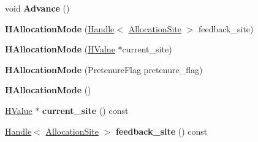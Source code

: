 \begin{DoxyCompactItemize}
\item 
\hypertarget{classv8_1_1internal_1_1_b_a_s_e___e_m_b_e_d_d_e_d_a4b06fdbbb29fc7d6641a995803b6d7ec}{}void {\bfseries Advance} ()\label{classv8_1_1internal_1_1_b_a_s_e___e_m_b_e_d_d_e_d_a4b06fdbbb29fc7d6641a995803b6d7ec}

\item 
\hypertarget{classv8_1_1internal_1_1_b_a_s_e___e_m_b_e_d_d_e_d_a0dffc75e1bed909e6597642502c4df79}{}{\bfseries H\+Allocation\+Mode} (\hyperlink{classv8_1_1internal_1_1_handle}{Handle}$<$ \hyperlink{classv8_1_1internal_1_1_allocation_site}{Allocation\+Site} $>$ feedback\+\_\+site)\label{classv8_1_1internal_1_1_b_a_s_e___e_m_b_e_d_d_e_d_a0dffc75e1bed909e6597642502c4df79}

\item 
\hypertarget{classv8_1_1internal_1_1_b_a_s_e___e_m_b_e_d_d_e_d_a4cca33cea9fb568478c40f6e2913b4a3}{}{\bfseries H\+Allocation\+Mode} (\hyperlink{classv8_1_1internal_1_1_h_value}{H\+Value} $\ast$current\+\_\+site)\label{classv8_1_1internal_1_1_b_a_s_e___e_m_b_e_d_d_e_d_a4cca33cea9fb568478c40f6e2913b4a3}

\item 
\hypertarget{classv8_1_1internal_1_1_b_a_s_e___e_m_b_e_d_d_e_d_a3d2dc2541dfb63d0025ca44ec56ea7d5}{}{\bfseries H\+Allocation\+Mode} (Pretenure\+Flag pretenure\+\_\+flag)\label{classv8_1_1internal_1_1_b_a_s_e___e_m_b_e_d_d_e_d_a3d2dc2541dfb63d0025ca44ec56ea7d5}

\item 
\hypertarget{classv8_1_1internal_1_1_b_a_s_e___e_m_b_e_d_d_e_d_a8182f526f7c5a8420cdf38bd3350a7e6}{}{\bfseries H\+Allocation\+Mode} ()\label{classv8_1_1internal_1_1_b_a_s_e___e_m_b_e_d_d_e_d_a8182f526f7c5a8420cdf38bd3350a7e6}

\item 
\hypertarget{classv8_1_1internal_1_1_b_a_s_e___e_m_b_e_d_d_e_d_a28ea17f84866440051abfcf5f6bbb5d4}{}\hyperlink{classv8_1_1internal_1_1_h_value}{H\+Value} $\ast$ {\bfseries current\+\_\+site} () const \label{classv8_1_1internal_1_1_b_a_s_e___e_m_b_e_d_d_e_d_a28ea17f84866440051abfcf5f6bbb5d4}

\item 
\hypertarget{classv8_1_1internal_1_1_b_a_s_e___e_m_b_e_d_d_e_d_a0540f7a417ec4cbca37c804bc82b2319}{}\hyperlink{classv8_1_1internal_1_1_handle}{Handle}$<$ \hyperlink{classv8_1_1internal_1_1_allocation_site}{Allocation\+Site} $>$ {\bfseries feedback\+\_\+site} () const \label{classv8_1_1internal_1_1_b_a_s_e___e_m_b_e_d_d_e_d_a0540f7a417ec4cbca37c804bc82b2319}


\end{DoxyCompactItemize}
